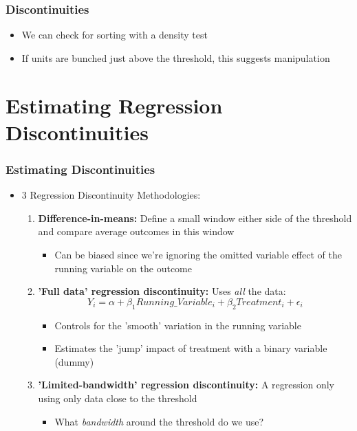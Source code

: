 \documentclass[xcolor=x11names,compress]{beamer}\usepackage[]{graphicx}\usepackage[]{color}
\renewcommand{\(}{\begin{columns}}
\renewcommand{\)}{\end{columns}}
\newcommand{\<}[1]{\begin{column}{#1}}
\renewcommand{\>}{\end{column}}
\begin{document}
\begin{frame}
\frametitle{Discontinuities}
\begin{itemize}
\item We can check for sorting with a density test
\item If units are bunched just above the threshold, this suggests manipulation
\end{itemize}

\end{frame}


\section{Estimating Regression Discontinuities}

\begin{frame}
\frametitle{Estimating Discontinuities}
\begin{itemize}
\item 3 Regression Discontinuity Methodologies:
\begin{enumerate}
\item \textbf{Difference-in-means:} Define a small window either side of the threshold and compare average outcomes in this window
\begin{itemize}
\item Can be biased since we're ignoring the omitted variable effect of the running variable on the outcome
\pause
\end{itemize}
\item \textbf{'Full data' regression discontinuity:} Uses \textit{all} the data:
$$Y_i = \alpha + \beta_1 Running\_Variable_i + \beta_2 Treatment_i + \epsilon_i$$
\begin{itemize}
\item Controls for the 'smooth' variation in the running variable
\item Estimates the 'jump' impact of treatment with a binary variable (dummy)
\pause
\end{itemize}
\item \textbf{'Limited-bandwidth' regression discontinuity:}  A regression only using only data close to the threshold
\begin{itemize}
\item What \textit{bandwidth} around the threshold do we use?
\end{itemize}
\end{enumerate}
\end{itemize}
\end{frame}
\end{document}
